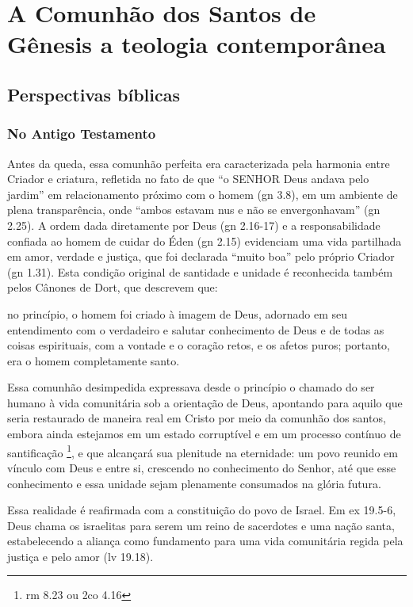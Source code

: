 \chapter{A Comunhão dos Santos de Gênesis a teologia contemporânea}

\section{Perspectivas bíblicas}

\subsection{No Antigo Testamento}

Antes da queda, essa comunhão perfeita era caracterizada pela harmonia entre Criador e criatura, refletida no fato de que ``o SENHOR Deus andava pelo jardim'' em relacionamento próximo com o homem (\gls{gn} 3.8), em um ambiente de plena transparência, onde ``ambos estavam nus e não se envergonhavam'' (\gls{gn} 2.25). A ordem dada diretamente por Deus (\gls{gn} 2.16-17) e a responsabilidade confiada ao homem de cuidar do Éden (\gls{gn} 2.15) evidenciam uma vida partilhada em amor, verdade e justiça, que foi declarada ``muito boa'' pelo próprio Criador (\gls{gn} 1.31). Esta condição original de santidade e unidade é reconhecida também pelos Cânones de Dort, que descrevem que:

\begin{citacao}
    no princípio, o homem foi criado à imagem de Deus, adornado em seu entendimento com o verdadeiro e salutar conhecimento de Deus e de todas as coisas espirituais, com a vontade e o coração retos, e os afetos puros; portanto, era o homem completamente santo. \cite{cdd}
\end{citacao}

Essa comunhão desimpedida expressava desde o princípio o chamado do ser humano à vida comunitária sob a orientação de Deus, apontando para aquilo que seria restaurado de maneira real em Cristo por meio da comunhão dos santos, embora ainda estejamos em um estado corruptível e em um processo contínuo de santificação \footnote{\gls{rm} 8.23 ou \gls{2co} 4.16}, e que alcançará sua plenitude na eternidade: um povo reunido em vínculo com Deus e entre si, crescendo no conhecimento do Senhor, até que esse conhecimento e essa unidade sejam plenamente consumados na glória futura.

Essa realidade é reafirmada com a constituição do povo de Israel. Em \gls{ex} 19.5-6, Deus chama os israelitas para serem um reino de sacerdotes e uma nação santa, estabelecendo a aliança como fundamento para uma vida comunitária regida pela justiça e pelo amor (\gls{lv} 19.18).

